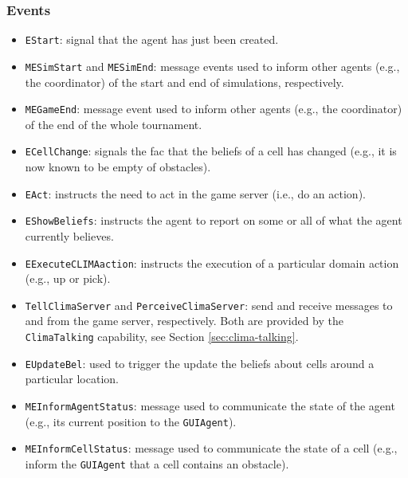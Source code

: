 \documentclass[10pt]{article}
\begin{document}





\subsubsection*{Events}
\begin{itemize}
\item \texttt{EStart}: signal that the agent has just been created.

\item \texttt{MESimStart} and \texttt{MESimEnd}: message events used to inform
other agents (e.g., the coordinator) of the start and end of simulations,
respectively.

\item \texttt{MEGameEnd}: message event used to inform other agents (e.g.,
the coordinator) of the end of the whole tournament.

\item \texttt{ECellChange}: signals the fac that the beliefs of a cell has changed (e.g., it is now known to be empty of obstacles).

\item \texttt{EAct}: instructs the need to act in the game server (i.e., do an
action).

\item \texttt{EShowBeliefs}: instructs the agent to report on some or all of
what the agent currently believes.

\item \texttt{EExecuteCLIMAaction}: instructs the execution of a particular
domain action (e.g., up or pick).

\item \texttt{TellClimaServer} and \texttt{PerceiveClimaServer}: send and
receive messages to and from the game server, respectively. Both
are provided by the \texttt{ClimaTalking} capability, see Section
\ref{sec:clima-talking}.

\item \texttt{EUpdateBel}: used to trigger the update the beliefs about cells
around a particular location.

\item \texttt{MEInformAgentStatus}: message used to communicate the state of the agent (e.g., its current position to the \texttt{GUIAgent}).

\item \texttt{MEInformCellStatus}: message used to communicate the state of a cell (e.g., inform the \texttt{GUIAgent} that a cell contains an obstacle).
\end{itemize}
\end{document}

